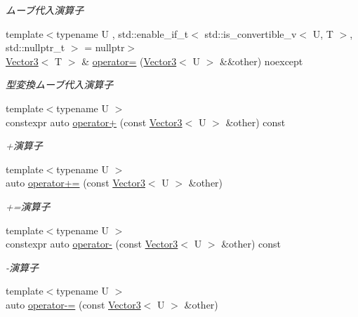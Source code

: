 \begin{DoxyCompactItemize}
\begin{DoxyCompactList}\small\item\em ムーブ代入演算子 \end{DoxyCompactList}\item 
{\footnotesize template$<$typename U , std\+::enable\+\_\+if\+\_\+t$<$ std\+::is\+\_\+convertible\+\_\+v$<$ U, T $>$, std\+::nullptr\+\_\+t $>$  = nullptr$>$ }\\\mbox{\hyperlink{classsaki_1_1_vector3}{Vector3}}$<$ T $>$ \& \mbox{\hyperlink{classsaki_1_1_vector3_ade6589bc06d9191aaccfe67cbd961a8b}{operator=}} (\mbox{\hyperlink{classsaki_1_1_vector3}{Vector3}}$<$ U $>$ \&\&other) noexcept
\begin{DoxyCompactList}\small\item\em 型変換ムーブ代入演算子 \end{DoxyCompactList}\item 
{\footnotesize template$<$typename U $>$ }\\constexpr auto \mbox{\hyperlink{classsaki_1_1_vector3_abd44b15228ed5ac36726acf4952b220e}{operator+}} (const \mbox{\hyperlink{classsaki_1_1_vector3}{Vector3}}$<$ U $>$ \&other) const
\begin{DoxyCompactList}\small\item\em +演算子 \end{DoxyCompactList}\item 
{\footnotesize template$<$typename U $>$ }\\auto \mbox{\hyperlink{classsaki_1_1_vector3_a99b24e43486d76b449b23239c80f70d7}{operator+=}} (const \mbox{\hyperlink{classsaki_1_1_vector3}{Vector3}}$<$ U $>$ \&other)
\begin{DoxyCompactList}\small\item\em +=演算子 \end{DoxyCompactList}\item 
{\footnotesize template$<$typename U $>$ }\\constexpr auto \mbox{\hyperlink{classsaki_1_1_vector3_a9ff13b4e1114404b1b5391cd6aecb7c7}{operator-\/}} (const \mbox{\hyperlink{classsaki_1_1_vector3}{Vector3}}$<$ U $>$ \&other) const
\begin{DoxyCompactList}\small\item\em -\/演算子 \end{DoxyCompactList}\item 
{\footnotesize template$<$typename U $>$ }\\auto \mbox{\hyperlink{classsaki_1_1_vector3_a3c15f413dc1c0aaef7311bd6dbb7224d}{operator-\/=}} (const \mbox{\hyperlink{classsaki_1_1_vector3}{Vector3}}$<$ U $>$ \&other)

\end{DoxyCompactItemize}
